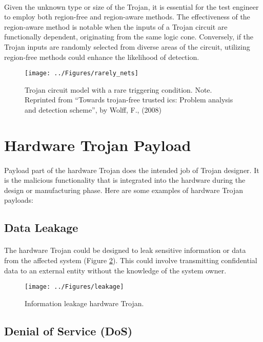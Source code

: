 \paragraph*{}
Given the unknown type or size of the Trojan, it is essential for the test engineer to employ both region-free and region-aware methods. The effectiveness of the region-aware method is notable when the inputs of a Trojan circuit are functionally dependent, originating from the same logic cone. Conversely, if the Trojan inputs are randomly selected from diverse areas of the circuit, utilizing region-free methods could enhance the likelihood of detection.
\begin{figure}[h]
	\centering
	\texttt{[image: ../Figures/rarely\_nets]}
	\caption{Trojan circuit model with a rare triggering condition. Note. Reprinted from “Towards trojan-free trusted ics: Problem analysis and detection scheme”, by Wolff, F., (2008)}
	\label{fig:rarelynets}
\end{figure}

\section{Hardware Trojan Payload}
\paragraph*{}
Payload part of the hardware Trojan does the intended job of Trojan designer. It is the malicious functionality that is integrated into the hardware during the design or manufacturing phase. Here are some examples of hardware Trojan payloads:
\subsection{Data Leakage}
\paragraph*{}
The hardware Trojan could be designed to leak sensitive information or data from the affected system (Figure \ref{fig:leakage}). This could involve transmitting confidential data to an external entity without the knowledge of the system owner.
\begin{figure}[h]
	\centering
	\texttt{[image: ../Figures/leakage]}
	\caption{Information leakage hardware Trojan.}
	\label{fig:leakage}
\end{figure}
\pagebreak
\subsection{Denial of Service (DoS)}
